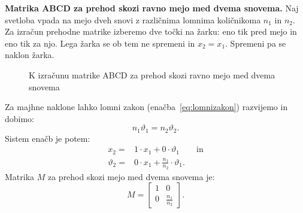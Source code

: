 \begin{example}
\label{ex:Mmeja}
{\bf Matrika ABCD za prehod skozi ravno mejo med dvema snovema.} Naj svetloba vpada na 
mejo dveh snovi z različnima lomnima količnikoma $n_1$ in $n_2$. Za izračun 
prehodne matrike izberemo dve točki na žarku: eno tik pred mejo in eno tik za njo. 
Lega žarka se ob tem ne spremeni in $x_2 = x_1$. 
Spremeni pa se naklon žarka. 
\begin{figure}[ht]
\centering
\def\svgwidth{70truemm} 

\caption{K izračunu matrike ABCD za prehod skozi ravno mejo med dvema snovema}
\label{fig:01_ABCD2}
\end{figure}

Za majhne naklone lahko lomni zakon
(enačba~\ref{eq:lomnizakon}) razvijemo in dobimo:
\begin{equation}
n_1 \vartheta_1 = n_2 \vartheta_2.
 \label{eq:02_36}
\end{equation}
Sistem enačb je potem:
\begin{align}
 x_2 =& 1\cdot x_1 + 0\cdot \vartheta_1 \qquad \mathrm{in} \label{eq:02_37}\\
 \vartheta_2 =& 0\cdot x_1 + \frac{n_1}{n_2}\cdot \vartheta_1.
 \label{eq:02_38}
\end{align}
Matrika $M$ za prehod skozi mejo med dvema snovema je:
\begin{equation}
 M = \left[\begin{array}{cc}
1& 0\\
0&\frac{n_1}{n_2}
\end{array}\right]\!\!.
\label{eq:02_39}
\end{equation}
\end{example}

